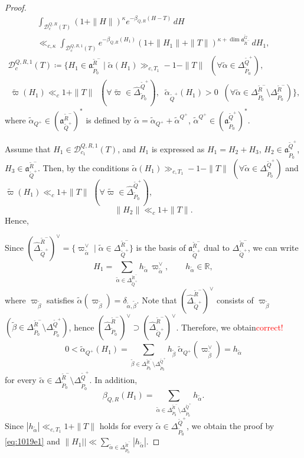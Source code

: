 \documentclass[12pt]{amsart}
\theoremstyle{definition}
\theoremstyle{plain}
\theoremstyle{remark}
\def\R{\mathbb{R}}%
\newcommand{\fa}{\mathfrak{a}}
\newcommand{\cD}{\mathcal{D}}
\numberwithin{equation}{section}
\newcommand{\tG}{\widetilde{G}}
\newcommand{\tP}{\widetilde{P}}
\newcommand{\tQ}{\widetilde{Q}}
\newcommand{\tR}{\widetilde{R}}
\newcommand{\talpha}{\widetilde{\alpha}}
\newcommand{\tbeta}{\widetilde{\beta}}
\newcommand{\tvarpi}{\widetilde{\varpi}}
\begin{document}
\begin{proof}
\begin{multline}    \label{eq:1019e1}
 \int_{\cD_c^{Q,R}(T)}
       (1+\|H\|)^\kappa e^{-\beta_{Q,R}(H-T)}\,dH  \\
\ll_{c,\kappa}   \int_{\cD_{c}^{Q,R,1}(T)}e^{-\beta_{Q,R}(H_1)}
       (1+\|H_1\|+\|T\|)^{\kappa+\dim\fa_{\tR^-}^{\tG}}  \, dH_1,    
\end{multline}
\begin{multline*}
\cD_{c}^{Q,R,1}(T)\coloneqq \{H_1\in \fa_{\tP_0}^{\tR^-} \mid   \talpha(H_1)\gg_{c,T_1}-1-\|T\|\;\; (\forall\talpha\in \Delta_{\tP_0}^{\tQ^+}), \\
 \ \tvarpi(H_1)\ll_c 1+\|T\|\;\; (\forall\tvarpi\in\widehat\Delta_{\tP_0}^{\tQ^+}), \;\;  \talpha_{\tQ^+}(H_1)>0\;\; (\forall \talpha\in\Delta_{\tP_0}^{\tR^-}\setminus \Delta_{\tP_0}^{\tR^-}) \},
\end{multline*}
where $\talpha_{Q^+}\in (\fa_{\tQ^+}^{\tR^-})^*$ is defined by $\talpha=\talpha_{Q^+}+\talpha^{Q^+}$, $\talpha^{Q^+}\in (\fa_{\tP_0}^{\tQ^+})^*$.


Assume that $H_1\in \cD_{c_1}^{Q,R,1}(T)$, and $H_1$ is expressed as $H_1=H_2 + H_3$, $H_2\in \fa_{\tP_0}^{\tQ^+}$, $H_3\in \fa^{\tR^-}_{\tQ^+}$. 
Then, by the conditions $\talpha(H_1)\gg_{c,T_1}-1-\|T\|$ $(\forall\talpha\in \Delta_{\tP_0}^{\tQ^+})$ and $\tvarpi(H_1)\ll_c 1+\|T\|$ $(\forall\tvarpi\in\widehat\Delta_{\tP_0}^{\tQ^+})$, 
\[
\|H_2\|\ll_c 1+\|T\|.
\]
Hence, 



Since $(\widehat{\Delta}_{\tQ^+}^{\tR^-})^\vee=\{ \varpi_{\talpha}^\vee \mid \talpha\in \Delta_{\tQ^+}^{\tR^-} \}$ is the basis of $\fa_{\tQ^+}^{\tR^-}$ dual to $\Delta_{\tQ^+}^{\tR^-}$, 
we can write
\[
H_1=\sum_{\talpha\in\Delta_{\tQ^+}^{\tR^-}} h_{\talpha}\, \varpi_{\talpha}^\vee,\qquad h_{\talpha}\in\R,
\]
where $\varpi_{\tbeta}$ satisfies $\talpha(\varpi_{\tbeta})=\delta_{\talpha,\tbeta}$.
Note that $(\widehat{\Delta}_{\tQ^+}^{\tR^-})^\vee$ consists of $\varpi_{\tbeta}$ $(\tbeta\in \Delta_{\tP_0}^{\tR^-}\setminus \Delta_{\tP_0}^{\tQ^+})$, hence $(\widehat{\Delta}_{\tP_0}^{\tR^-})^\vee\supset (\widehat{\Delta}_{\tQ^+}^{\tR^-})^\vee$. 
Therefore, we obtain\textcolor{red}{correct!}
\[
0<\talpha_{Q^+}(H_1)=\sum_{\tbeta\in\Delta_{\tP_0}^{\tR^-}\setminus \Delta_{\tP_0}^{\tQ^+}}h_{\tbeta}\ \talpha_{Q^+}(\varpi_{\tbeta}^\vee)=h_{\talpha}
\]
for every $\talpha\in\Delta_{\tP_0}^{\tR^-}\setminus \Delta_{\tP_0}^{\tQ^+}$. 
In addition,
\[
\beta_{Q,R}(H_1)=\sum_{\talpha\in\Delta_{\tP_0}^{\tR^-}\setminus \Delta_{\tP_0}^{\tQ^+}} h_{\talpha}.
\]
Since $|h_{\talpha}|\ll_{c,T_1} 1+\|T\|$ holds for every $\talpha\in\Delta_{\tP_0}^{\tQ^+}$, we obtain the proof by \eqref{eq:1019e1} and $\|H_1||\ll \sum_{\talpha\in \Delta_{\tP_0}^{\tR^-}}|h_{\talpha}|$.
\fi
\end{proof}
\end{document}
